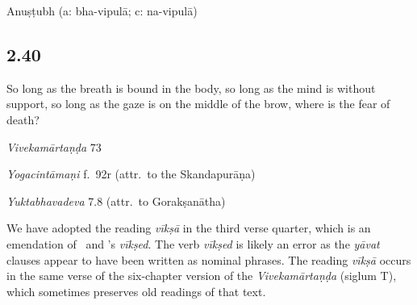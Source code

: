 \begin{ekdosis}
\begin{metre}[hp02_039]
Anuṣṭubh (a: bha-vipulā; c: na-vipulā)
\end{metre}

\subsection*{2.40}
\begin{translation}[hp02_040]
So long as the breath is bound in the body, so long as the mind is without support, so long as the gaze is on the middle of the brow, where is the fear of death?
\end{translation}

\begin{sources}[hp02_040]
\emph{Vivekamārtaṇḍa} 73

\begin{versinnote}
\tl{\var{vīkṣā] T; dṛṣṭir \emph{cett.}}}

\end{versinnote}
\end{sources}

\begin{testimonia}[hp02_040]
\emph{Yogacintāmaṇi} f.~92r (attr.~to the Skandapurāṇa)

\begin{versinnote}
\end{versinnote}

\emph{Yuktabhavadeva} 7.8 (attr.~to Gorakṣanātha)

\begin{versinnote}
\end{versinnote}
\end{testimonia}

\begin{philcomm}[hp02_040]
We have adopted the reading \emph{vīkṣā} in the third verse quarter, which is an emendation of \alphaOne\ and \alphaTwo's \emph{vīkṣed}. The verb \emph{vīkṣed} is likely an error as the \emph{yāvat} clauses appear to have been written as nominal phrases. The reading \emph{vīkṣā} occurs in the same verse of the six-chapter version of the \emph{Vivekamārtaṇḍa} (siglum T), which sometimes preserves old readings of that text.  


\end{philcomm}
\end{ekdosis}
